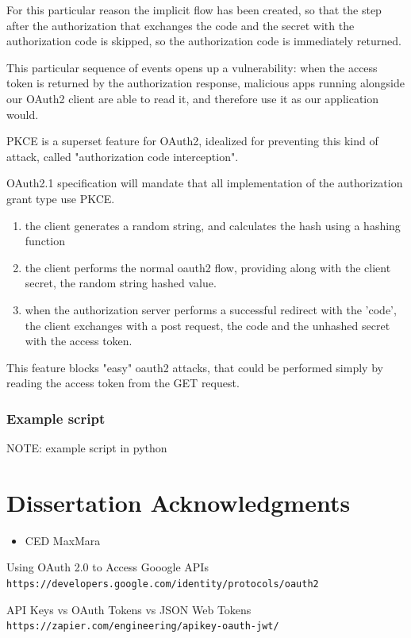 \documentclass[11pt]{style}
\begin{document}
For this particular reason the implicit flow has been created, so
that the step after the authorization that exchanges the code and the secret
with the authorization code is skipped, so the authorization code is immediately
returned.

This particular sequence of events opens up a vulnerability:
when the access token is returned by the authorization response, malicious apps
running alongside our OAuth2 client are able to read it, and therefore use it as
our application would.

PKCE is a superset feature for OAuth2, idealized for preventing this kind of
attack, called "authorization code interception".

OAuth2.1 specification will mandate that all implementation of the authorization
grant type use PKCE.

\begin{enumerate}
    \item the client generates a random string, and calculates the hash using a
        hashing function
    \item the client performs the normal oauth2 flow, providing along with the
        client secret, the random string hashed value.
    \item when the authorization server performs a successful redirect with the
        'code', the client exchanges with a post request, the code and the
        unhashed secret with the access token.
\end{enumerate}

This feature blocks "easy" oauth2 attacks, that could be performed simply by
reading the access token from the GET request.

\subsubsection{Example script}
NOTE: example script in python

\section{Dissertation Acknowledgments}
\begin{itemize}
    \item CED MaxMara
\end{itemize}

\begin{thebibliography}{9}
    Using OAuth 2.0 to Access Gooogle APIs
    \\
    \texttt{https://developers.google.com/identity/protocols/oauth2}

    API Keys vs OAuth Tokens vs JSON Web Tokens
    \\
    \texttt{https://zapier.com/engineering/apikey-oauth-jwt/}

\end{thebibliography}

\newpage
\end{document}
